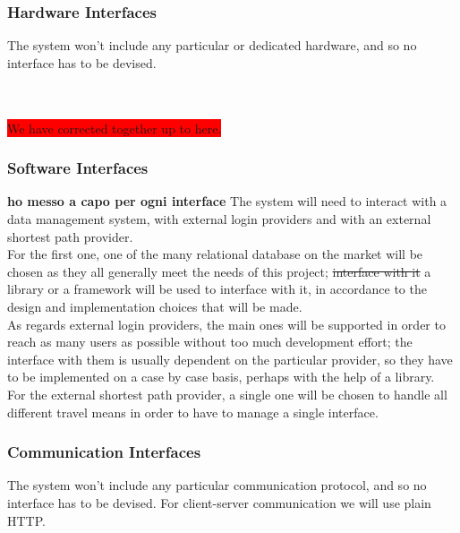 \subsubsection{Hardware Interfaces}

The system won't include any particular or dedicated hardware, and so no interface has to be devised.

~\\
~\\
\colorbox{red}{We have corrected together up to here.}
~\\

\subsubsection{Software Interfaces}
\textbf{ho messo a capo per ogni interface}
The system will need to interact with a data management system, with external login providers and with an external shortest path provider.\\
For the first one, one of the many relational database on the market will be chosen as they all generally meet the needs of this project; \st{interface with it} a library or a framework will be used to interface with it, in accordance to the design and implementation choices that will be made.\\
As regards external login providers, the main ones will be supported in order to reach as many users as possible without too much development effort; the interface with them is usually dependent on the particular provider, so they have to be implemented on a case by case basis, perhaps with the help of a library.\\
For the external shortest path provider, a single one will be chosen to handle all different travel means in order to have to manage a single interface.

\subsubsection{Communication Interfaces}

The system won't include any particular communication protocol, and so no interface has to be devised. For client-server communication we will use plain HTTP.